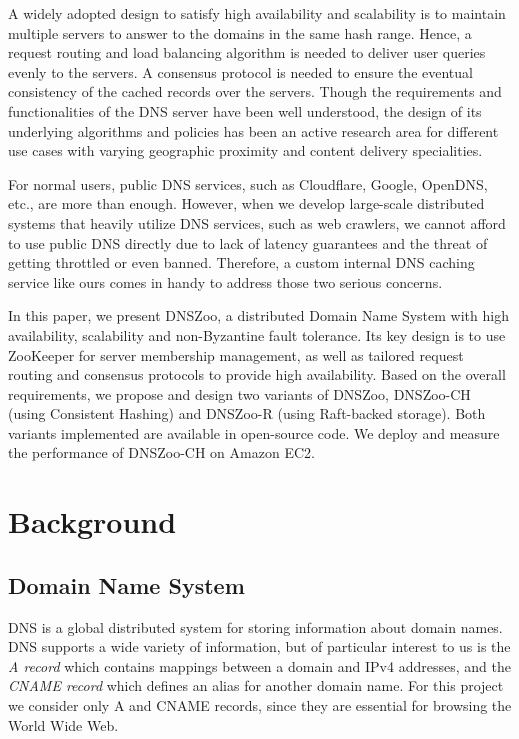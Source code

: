 \documentclass[format=sigconf,nonacm,screen]{acmart}
\newcommand{\dnszoo}{\textsf{DNSZoo}}
\newcommand{\dnszooch}{\textsf{DNSZoo-CH}}
\newcommand{\dnszoor}{\textsf{DNSZoo-R}}
\begin{document}
A widely adopted design to satisfy high availability and scalability is to maintain multiple servers to answer to the domains in the same hash range. Hence, a request routing and load balancing algorithm is needed to deliver user queries evenly to the servers. A consensus protocol is needed to ensure the eventual consistency of the cached records over the servers. Though the requirements and functionalities of the DNS server have been well understood, the design of its underlying algorithms and policies has been an active research area \cite{1999redirection,2004cdn,2004democratizing,2020dns} for different use cases with varying geographic proximity and content delivery specialities.

For normal users, public DNS services, such as Cloudflare, Google, OpenDNS, etc., are more than enough. However, when we develop large-scale distributed systems that heavily utilize DNS services, such as web crawlers, we cannot afford to use public DNS directly due to lack of latency guarantees and the threat of getting throttled or even banned. Therefore, a custom internal DNS caching service like ours comes in handy to address those two serious concerns.

In this paper, we present \dnszoo{}, a distributed Domain Name System with high availability, scalability and non-Byzantine fault tolerance. Its key design is to use ZooKeeper for server membership management, as well as tailored request routing and consensus protocols to provide high availability. Based on the overall requirements, we propose and design two variants of \dnszoo{}, \dnszooch{} (using Consistent Hashing) and \dnszoor{} (using Raft-backed storage). Both variants implemented are available in open-source code. We deploy and measure the performance of \dnszooch{} on Amazon EC2.



\section{Background}

\subsection{Domain Name System}

DNS \cite{rfc1034,rfc1035} is a global distributed system for storing information about domain names. DNS supports a wide variety of information, but of particular interest to us is the \emph{A record} which contains mappings between a domain and IPv4 addresses, and the \emph{CNAME record} which defines an alias for another domain name. For this project we consider only A and CNAME records, since they are essential for browsing the World Wide Web.
\end{document}
